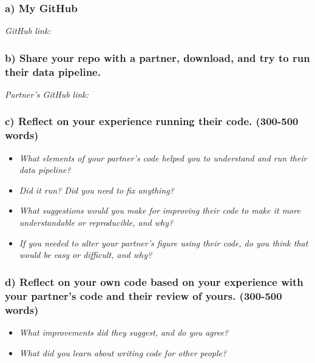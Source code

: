 \documentclass[
]{article}
\begin{document}
\subsubsection{a) My GitHub}\label{a-my-github}

\emph{GitHub link:}

\subsubsection{b) Share your repo with a partner, download, and try to
run their data
pipeline.}\label{b-share-your-repo-with-a-partner-download-and-try-to-run-their-data-pipeline.}

\emph{Partner's GitHub link:}

\subsubsection{c) Reflect on your experience running their code.
(300-500
words)}\label{c-reflect-on-your-experience-running-their-code.-300-500-words}

\begin{itemize}
\item
  \emph{What elements of your partner's code helped you to understand
  and run their data pipeline?}
\item
  \emph{Did it run? Did you need to fix anything?}
\item
  \emph{What suggestions would you make for improving their code to make
  it more understandable or reproducible, and why?}
\item
  \emph{If you needed to alter your partner's figure using their code,
  do you think that would be easy or difficult, and why?}
\end{itemize}

\subsubsection{d) Reflect on your own code based on your experience with
your partner's code and their review of yours. (300-500
words)}\label{d-reflect-on-your-own-code-based-on-your-experience-with-your-partners-code-and-their-review-of-yours.-300-500-words}

\begin{itemize}
\item
  \emph{What improvements did they suggest, and do you agree?}
\item
  \emph{What did you learn about writing code for other people?}
\end{itemize}
\end{document}

